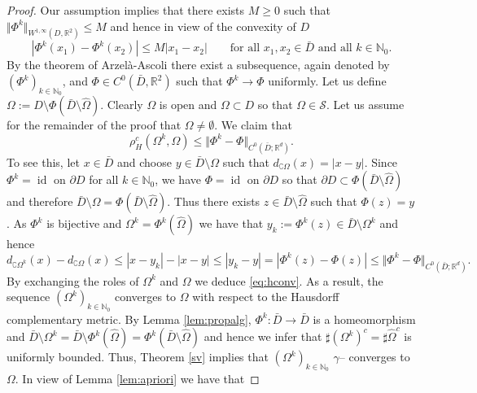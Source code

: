 \documentclass[a4paper,10pt]{article}
\newcommand{\Omref}{\hat \Omega}
\theoremstyle{plain}
\theoremstyle{plain}
\numberwithin{equation}{section}
\DeclareMathOperator{\id}{id}
\begin{document}
\begin{proof} Our assumption implies that there exists $M \geq 0$ such that $\Vert \Phi^k \Vert_{W^{1,\infty}(D,\mathbb R^2)} \leq M$ and hence in view of the convexity of $D$
\begin{equation} \label{eq:lipbound}
| \Phi^k(x_1)-\Phi^k(x_2) | \leq M | x_1-x_2| \qquad \mbox{for all } x_1,x_2 \in \bar D \mbox{ and all } k \in \mathbb N_0.
\end{equation}
By the theorem of Arzel\`a-Ascoli there exist a subsequence, again denoted by $(\Phi^k)_{k\in\mathbb{N}_0}$, and $\Phi \in C^0(\bar D,\mathbb{R}^2)$ such that $\Phi^k \rightarrow \Phi$ uniformly.
Let us define $\Omega:= D \setminus \Phi(\bar D \setminus \Omref)$. Clearly $\Omega$ is open and
$\Omega \subset D$ so that $\Omega \in \mathcal S$. Let us assume for the remainder of the proof that $\Omega \neq \emptyset$. We claim that
\begin{equation} \label{eq:hconv}
\rho_H^c(\Omega^k,\Omega) \leq \Vert \Phi^k - \Phi \Vert_{C^0(\bar D;\mathbb R^d)}.
\end{equation}
To see this, let $x \in \bar D$ and choose $y \in \bar D \setminus \Omega$ such that
$d_{\complement \Omega}(x) = | x-y|$. Since $\Phi^k=\id$ on $\partial D$ for all $k \in \mathbb N_0$, we have $\Phi=\id$ on $\partial D$ 
so that  $\partial D \subset \Phi(\bar D \setminus \Omref)$ and therefore
$\bar D \setminus \Omega = \Phi(\bar D \setminus \Omref)$. Thus 
there exists $z \in \bar D \setminus \Omref$ such that $\Phi(z)=y$. As $\Phi^k$ is bijective and $\Omega^k=
\Phi^k(\Omref)$ we have that  $y_k:= \Phi^k(z) \in \bar D\setminus \Omega^k$ and hence
\begin{displaymath}
d_{\complement \Omega^k}(x)  - d_{\complement \Omega}(x) \leq | x - y_k | - | x- y| \leq | y_k - y |
= | \Phi^k(z) - \Phi(z) | \leq \Vert \Phi^k - \Phi \Vert_{C^0(\bar D;\mathbb R^d)}.
\end{displaymath}
By exchanging the roles of $\Omega^k$ and $\Omega$ we deduce \eqref{eq:hconv}. 
As a result, the sequence $(\Omega^k)_{k \in \mathbb N_0}$ converges to $\Omega$ with respect to
the Hausdorff complementary metric. By Lemma \ref{lem:propalg},  $\Phi^k: \bar D \rightarrow \bar D$ is a homeomorphism and $\bar D \setminus \Omega^k= \bar D \setminus \Phi^k(\Omref)= \Phi^k(\bar D \setminus \Omref)$ and hence we infer that $\sharp (\Omega^k)^c= \sharp \Omref^c$ 
is uniformly bounded. Thus, Theorem \ref{sv} implies that
$(\Omega^k)_{k \in \mathbb N_0}$ $\gamma$-- converges to $\Omega$.
In view of Lemma \ref{lem:apriori} we have that

\end{proof}
\end{document}

